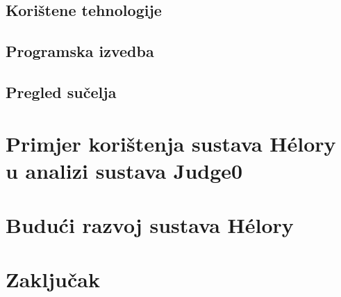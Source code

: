 \documentclass[times, utf8, diplomski]{fer}
\begin{document}
\section{Korištene tehnologije}
\section{Programska izvedba}
\section{Pregled sučelja}

\chapter{Primjer korištenja sustava Hélory u analizi sustava Judge0}

\chapter{Budući razvoj sustava Hélory}

\chapter{Zaključak}




\begin{sazetak}
\end{sazetak}

\begin{abstract}
\end{abstract}
\end{document}
